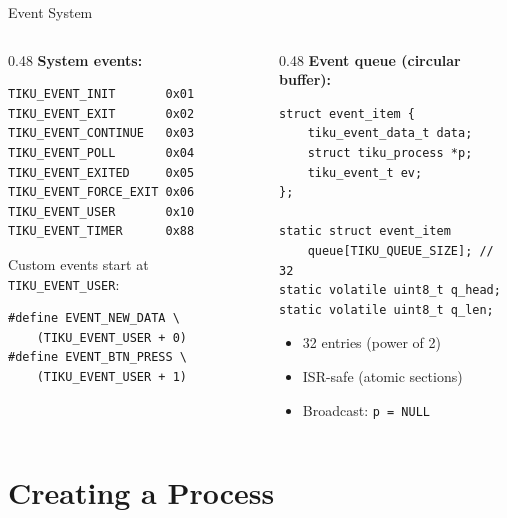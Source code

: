 \documentclass[aspectratio=169, 10pt]{beamer}
\begin{document}
\begin{frame}[fragile]{Event System}
\begin{columns}[T]
\begin{column}{0.48\textwidth}
\textbf{System events:}
\begin{lstlisting}[style=cstyle]
TIKU_EVENT_INIT       0x01
TIKU_EVENT_EXIT       0x02
TIKU_EVENT_CONTINUE   0x03
TIKU_EVENT_POLL       0x04
TIKU_EVENT_EXITED     0x05
TIKU_EVENT_FORCE_EXIT 0x06
TIKU_EVENT_USER       0x10
TIKU_EVENT_TIMER      0x88
\end{lstlisting}

Custom events start at \texttt{TIKU\_EVENT\_USER}:
\begin{lstlisting}[style=cstyle]
#define EVENT_NEW_DATA \
    (TIKU_EVENT_USER + 0)
#define EVENT_BTN_PRESS \
    (TIKU_EVENT_USER + 1)
\end{lstlisting}
\end{column}

\begin{column}{0.48\textwidth}
\textbf{Event queue (circular buffer):}
\begin{lstlisting}[style=cstyle]
struct event_item {
    tiku_event_data_t data;
    struct tiku_process *p;
    tiku_event_t ev;
};

static struct event_item
    queue[TIKU_QUEUE_SIZE]; // 32
static volatile uint8_t q_head;
static volatile uint8_t q_len;
\end{lstlisting}

\begin{itemize}
  \item 32 entries (power of 2)
  \item ISR-safe (atomic sections)
  \item Broadcast: \texttt{p = NULL}
\end{itemize}
\end{column}
\end{columns}
\end{frame}

\section{Creating a Process}
\end{document}
